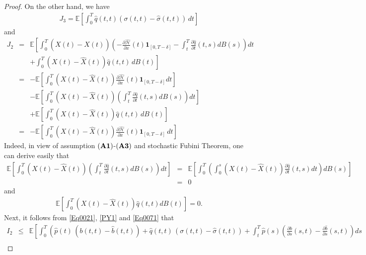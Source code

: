 \documentclass[12pt]{article}
\theoremstyle{remark}
\numberwithin{equation}{section}
\def\E{\mathbb E}
\def\E{\mathbb E}
\begin{document}
\begin{proof}
On the other hand, we have
\begin{eqnarray}\label{PY1}
	J_3= \mathbb{E}\left[ \int_{0}^{T}\hat{q}(t,t)\left(\sigma(t,t)-\hat{\sigma}(t,t)\right)\,dt\right]
\end{eqnarray}
and
\begin{eqnarray}\label{Eq0071}
	J_2&=&\E\left[\int_{0}^{T}\left( X(t)-\hat{X}(t)\right) \left(-\frac{\partial \hat{\mathcal{H}}}{\partial x}(t)\mathbf{1}_{[0,T-\delta]}-\int_{t}^{T}\frac{\partial \hat{q}}{\partial t}(t,s)dB(s)\right)dt\right.\nonumber \\
	&&\left.+\int_0^T \left( X(t)-\hat{X}(t)\right) \hat{q}(t,t)\,dB(t)\right] \nonumber\\
	&=& -\E\left[\int_{0}^{T}\left( X(t)-\hat{X}(t)\right) \frac{\partial \hat{\mathcal{H}}}{\partial x}(t)\mathbf{1}_{[0,T-\delta]}dt\right]\nonumber \\
	&&-\E\left[\int_{0}^{T}\left( X(t)-\hat{X}(t)\right) \left(\int_{t}^{T}\frac{\partial \hat{q}}{\partial t}(t,s)dB(s)\right)dt\right]\nonumber\\
	&&+\E\left[\int_0^T \left( X(t)-\hat{X}(t)\right) \hat{q}(t,t)\,dB(t)\right]\nonumber\\
	&=&-\E\left[\int_{0}^{T}\left( X(t)-\hat{X}(t)\right) \frac{\partial \hat{\mathcal{H}}}{\partial x}(t)\mathbf{1}_{[0,T-\delta]}\,dt\right]
\end{eqnarray}
Indeed, in view of assumption $({\bf A1})$-$({\bf A3})$ and stochastic Fubini Theorem, one can derive easily that 
\begin{eqnarray*}
	\E\left[\int_{0}^{T}\left( X(t)-\hat{X}(t)\right) \left(\int_{t}^{T}\frac{\partial \hat{q}}{\partial t}(t,s)dB(s)\right)dt\right]&=&\E\left[\int_{0}^{T}\left(\int_{0}^{s}\left(X(t)-\hat{X}(t)\right) \frac{\partial \hat{q}}{\partial t}(t,s)dt\right)dB(s)\right]\\
	&=& 0
\end{eqnarray*}
and 
\begin{eqnarray*}
\E\left[\int_0^T \left( X(t)-\hat{X}(t)\right) \hat{q}(t,t)dB(t)\right]=0.
\end{eqnarray*}
Next, it follows from \eqref{Eq0021}, \eqref{PY1} and \eqref{Eq0071} that
\begin{eqnarray}\label{Ep008}
I_2 &\leq & \E \left[\int_0^T \left(\hat{p}(t)\,\left(b(t,t)-\hat{b}(t,t)\right)
	+ \hat{q}(t,t)\,\left( \sigma(t,t)-\hat{\sigma}(t,t)\right)+ \int_t^T \hat{p}(s) \left( \frac{\partial b}{\partial s}(s,t)-\frac{\partial \hat{b}}{\partial s}(s,t)\right)ds\right.\right.  \nonumber\\

\end{eqnarray}
\end{proof}
\end{document}
